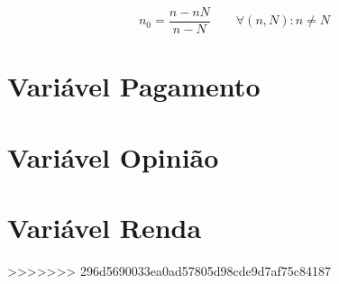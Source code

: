 \documentclass[10pt,a4paper,oneside]{article}
\begin{document}
	\begin{equation}
		n_0 = \frac{n-n N}{n-N} \qquad \forall (n, N) : n \neq N
	\label{equation: tamanho amostral maximo}
	\end{equation}

\section{Variável Pagamento}
\label{questao:4}


\section{Variável Opinião}
\label{questao:5}


\section{Variável Renda}
\label{questao:6}

>>>>>>> 296d5690033ea0ad57805d98cde9d7af75c84187
\end{document}
